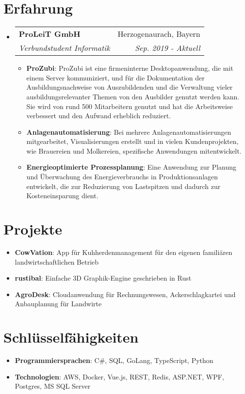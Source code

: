 \documentclass[letterpaper,11pt]{article}
\makeatletter
\newcommand{\resumeItem}[2]{
  \item\small{
    \textbf{#1}{: #2 \vspace{-2pt}}
  }
}
\newcommand{\resumeSubheading}[4]{
  \vspace{-1pt}\item
    \begin{tabular*}{0.97\textwidth}{l@{\extracolsep{\fill}}r}
      \textbf{#1} & #2 \\
      \textit{\small#3} & \textit{\small #4} \\
    \end{tabular*}\vspace{-5pt}
}
\newcommand{\resumeSubItem}[2]{\resumeItem{#1}{#2}\vspace{-4pt}}
\newcommand{\resumeSubHeadingListStart}{\begin{itemize}[leftmargin=*]}
\newcommand{\resumeSubHeadingListEnd}{\end{itemize}}
\newcommand{\resumeItemListStart}{\begin{itemize}}
\newcommand{\resumeItemListEnd}{\end{itemize}\vspace{-5pt}}
\makeatother
\begin{document}
\section{Erfahrung}
  \resumeSubHeadingListStart
    \resumeSubheading
      {ProLeiT GmbH}{Herzogenaurach, Bayern}
      {Verbundstudent Informatik}{Sep. 2019 - Aktuell}
      \resumeItemListStart
        \resumeItem{ProZubi}
          {ProZubi ist eine firmeninterne Desktopanwendung, die mit einem Server kommuniziert, und für die Dokumentation der Ausbildungsnachweise von Auszubildenden und die Verwaltung vieler ausbildungsrelevanter Themen von den Ausbilder genutzt werden kann. Sie wird von rund 500 Mitarbeitern genutzt und hat die Arbeitsweise verbessert und den Aufwand erheblich reduziert.}
        \resumeItem{Anlagenautomatisierung}
          {Bei mehrere Anlagenautomatisierungen mitgearbeitet, Visualisierungen erstellt und in vielen Kundenprojekten, wie Brauereien und Molkereien, spezifische Anwendungen mitentwickelt.}
        \resumeItem{Energieoptimierte Prozessplanung}
          {Eine Anwendung zur Planung und Überwachung des Energieverbrauchs in Produktionsanlagen entwickelt, die zur Reduzierung von Lastspitzen und dadurch zur Kosteneinsparung dient.}
      \resumeItemListEnd

  \resumeSubHeadingListEnd


\section{Projekte}
  \resumeSubHeadingListStart
    \resumeSubItem{CowVation}
      {App für Kuhherdenmanagement für den eigenen familiären landwirtschaftlichen Betrieb}
    \resumeSubItem{rustibal}
      {Einfache 3D Graphik-Engine geschrieben in Rust}
    \resumeSubItem{AgroDesk}
      {Cloudanwendung für Rechnungswesen, Ackerschlagkartei und Anbauplanung für Landwirte}
  \resumeSubHeadingListEnd

%
\section{Schlüsselfähigkeiten}
 \resumeSubHeadingListStart
    \resumeSubItem{Programmiersprachen}
      {C\#, SQL, GoLang, TypeScript, Python}
    \resumeSubItem{Technologien}
      {AWS, Docker, Vue.js, REST, Redis, ASP.NET, WPF, Postgres, MS SQL Server}
 \resumeSubHeadingListEnd


\end{document}
